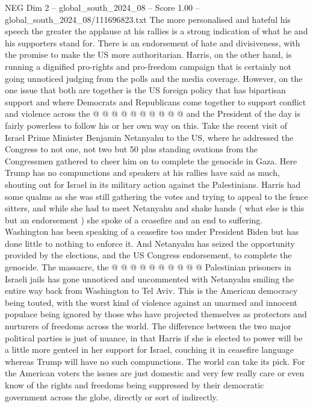 \begin{textsample}{NEG Dim 2 – global\_south\_2024\_08 – Score 1.00 – global\_south\_2024\_08/111696823.txt}
The more personalised and hateful his speech the greater the applause at his rallies is a strong indication of what he and his supporters stand for.
There is an endorsement of hate and divisiveness, with the promise to make the US more authoritarian.
Harris, on the other hand, is running a dignified pro-rights and pro-freedom campaign that is certainly not going unnoticed judging from the polls and the media coverage.
However, on the one issue that both are together is the US foreign policy that has bipartisan support and where Democrats and Republicans come together to support conflict and violence across the @ @ @ @ @ @ @ @ @ @ and the President of the day is fairly powerless to follow his or her own way on this.
Take the recent visit of Israel Prime Minister Benjamin Netanyahu to the US, where he addressed the Congress to not one, not two but 50 plus standing ovations from the Congressmen gathered to cheer him on to complete the genocide in Gaza.
Here Trump has no compunctions and speakers at his rallies have said as much, shouting out for Israel in its military action against the Palestinians.
Harris had some qualms as she was still gathering the votes and trying to appeal to the fence sitters, and while she had to meet Netanyahu and shake hands ( what else is this but an endorsement ) she spoke of a ceasefire and an end to suffering.
Washington has been speaking of a ceasefire too under President Biden but has done little to nothing to enforce it.
And Netanyahu has seized the opportunity provided by the elections, and the US Congress endorsement, to complete the genocide.
The massacre, the @ @ @ @ @ @ @ @ @ @ Palestinian prisoners in Israeli jails has gone unnoticed and uncommented with Netanyahu smiling the entire way back from Washington to Tel Aviv.
This is the American democracy being touted, with the worst kind of violence against an unarmed and innocent populace being ignored by those who have projected themselves as protectors and nurturers of freedoms across the world.
The difference between the two major political parties is just of nuance, in that Harris if she is elected to power will be a little more genteel in her support for Israel, couching it in ceasefire language whereas Trump will have no such compunctions.
The world can take its pick.
For the American voters the issues are just domestic and very few really care or even know of the rights and freedoms being suppressed by their democratic government across the globe, directly or sort of indirectly.

\end{textsample}

